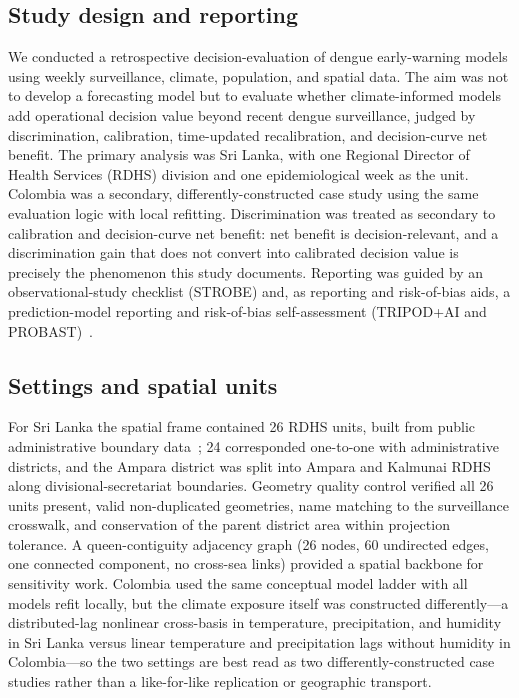 \documentclass[11pt,a4paper]{article}
\begin{document}
\subsection{Study design and reporting}
We conducted a retrospective decision-evaluation of dengue early-warning models using weekly surveillance, climate, population, and spatial data. The aim was not to develop a forecasting model but to evaluate whether climate-informed models add operational decision value beyond recent dengue surveillance, judged by discrimination, calibration, time-updated recalibration, and decision-curve net benefit. The primary analysis was Sri Lanka, with one Regional Director of Health Services (RDHS) division and one epidemiological week as the unit. Colombia was a secondary, differently-constructed case study using the same evaluation logic with local refitting. Discrimination was treated as secondary to calibration and decision-curve net benefit: net benefit is decision-relevant, and a discrimination gain that does not convert into calibrated decision value is precisely the phenomenon this study documents. Reporting was guided by an observational-study checklist (STROBE) and, as reporting and risk-of-bias aids, a prediction-model reporting and risk-of-bias self-assessment (TRIPOD+AI and PROBAST)~\cite{vonElm2007,Collins2024TRIPODAI,Wolff2019,Moons2019}.

\subsection{Settings and spatial units}
For Sri Lanka the spatial frame contained 26 RDHS units, built from public administrative boundary data~\cite{HDXCODABSriLanka}; 24 corresponded one-to-one with administrative districts, and the Ampara district was split into Ampara and Kalmunai RDHS along divisional-secretariat boundaries. Geometry quality control verified all 26 units present, valid non-duplicated geometries, name matching to the surveillance crosswalk, and conservation of the parent district area within projection tolerance. A queen-contiguity adjacency graph (26 nodes, 60 undirected edges, one connected component, no cross-sea links) provided a spatial backbone for sensitivity work. Colombia used the same conceptual model ladder with all models refit locally, but the climate exposure itself was constructed differently---a distributed-lag nonlinear cross-basis in temperature, precipitation, and humidity in Sri Lanka versus linear temperature and precipitation lags without humidity in Colombia---so the two settings are best read as two differently-constructed case studies rather than a like-for-like replication or geographic transport.
\end{document}
